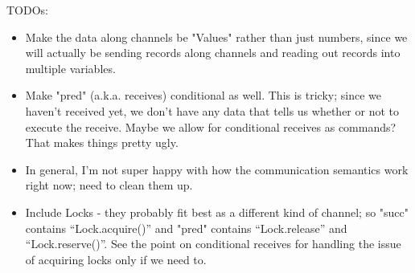 \documentclass{article}
\begin{document}
TODOs:
\begin{itemize}
\item Make the data along channels be "Values" rather than just numbers, since 
we will actually be sending records along channels and reading out records into multiple variables.
\item Make "pred" (a.k.a. receives) conditional as well. This is tricky; since we haven't
received yet, we don't have any data that tells us whether or not to execute the receive.
Maybe we allow for conditional receives as commands? That makes things pretty ugly.
\item In general, I'm not super happy with how the communication semantics work right now;
need to clean them up.
\item Include Locks - they probably fit best as a different kind of channel;
so "succ" contains ``Lock.acquire()'' and "pred" contains ``Lock.release'' and
``Lock.reserve()''. See the point on conditional receives for handling the issue
of acquiring locks only if we need to.
\end{itemize}

\begin{figure}[h]
\begin{syntax}
  








\end{syntax}
\end{figure}
\end{document}
